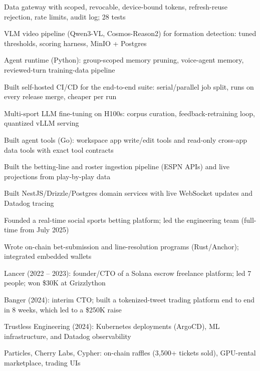 \documentclass[print]{jack-resume}
\begin{document}
\begin{tightemize}
    \item Data gateway with scoped, revocable, device-bound tokens, refresh-reuse rejection, rate limits, audit log; 28 tests
    \item VLM video pipeline (Qwen3-VL, Cosmos-Reason2) for formation detection: tuned thresholds, scoring harness, MinIO + Postgres
    \item Agent runtime (Python): group-scoped memory pruning, voice-agent memory, reviewed-turn training-data pipeline
    \item Built self-hosted CI/CD for the end-to-end suite: serial/parallel job split, runs on every release merge, cheaper per run
    \item Multi-sport LLM fine-tuning on H100s: corpus curation, feedback-retraining loop, quantized vLLM serving
    \item Built agent tools (Go): workspace app write/edit tools and read-only cross-app data tools with exact tool contracts
\end{tightemize}
\sectionsep

\begin{tightemize}
    \item Built the betting-line and roster ingestion pipeline (ESPN APIs) and live projections from play-by-play data
    \item Built NestJS/Drizzle/Postgres domain services with live WebSocket updates and Datadog tracing
    \item Founded a real-time social sports betting platform; led the engineering team (full-time from July 2025)
    \item Wrote on-chain bet-submission and line-resolution programs (Rust/Anchor); integrated embedded wallets
\end{tightemize}
\sectionsep

\begin{tightemize}
    \item Lancer (2022 – 2023): founder/CTO of a Solana escrow freelance platform; led 7 people; won \$30K at Grizzlython
    \item Banger (2024): interim CTO; built a tokenized-tweet trading platform end to end in 8 weeks, which led to a \$250K raise
    \item Trustless Engineering (2024): Kubernetes deployments (ArgoCD), ML infrastructure, and Datadog observability
    \item Particles, Cherry Labs, Cypher: on-chain raffles (3,500+ tickets sold), GPU-rental marketplace, trading UIs
\end{tightemize}
\sectionsep
\end{document}
